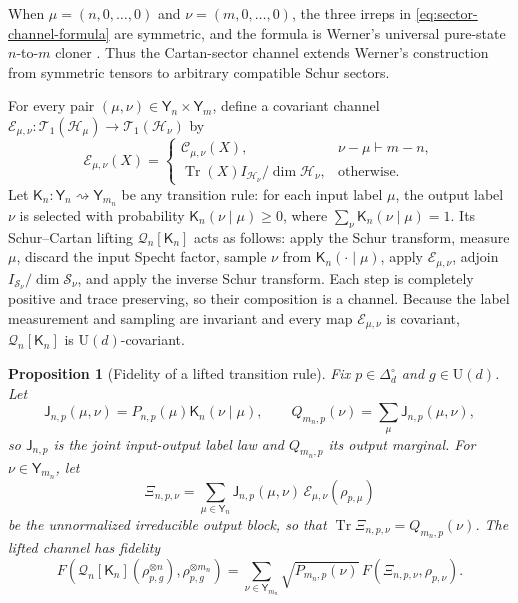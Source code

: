 \documentclass[11pt]{article}
\newtheorem{proposition}[proposition]{Proposition}
\theoremstyle{remark}
\theoremstyle{plain}
\newcommand{\cC}{\mathcal C}
\newcommand{\cE}{\mathcal E}
\newcommand{\cH}{\mathcal H}
\newcommand{\cS}{\mathcal S}
\newcommand{\cT}{\mathcal T}
\newcommand{\U}{\mathrm U}
\newcommand{\Tr}{\operatorname{Tr}}
\newcommand{\ot}{\otimes}
\begin{document}
When \(\mu=(n,0,\ldots,0)\) and \(\nu=(m,0,\ldots,0)\), the three
irreps in \eqref{eq:sector-channel-formula} are symmetric,
and the formula is Werner's universal pure-state \(n\)-to-\(m\) cloner
\cite{Werner1998}.  Thus the Cartan-sector channel extends Werner's
construction from symmetric tensors to arbitrary compatible Schur sectors.

For every pair \((\mu,\nu)\in\mathsf Y_n\times\mathsf Y_m\), define a
covariant channel \(\cE_{\mu,\nu}:\cT_1(\cH_\mu)\to\cT_1(\cH_\nu)\) by
\begin{equation}\label{eq:sector-channel-extension}
  \cE_{\mu,\nu}(X)=
  \begin{cases}
    \cC_{\mu,\nu}(X),&\nu-\mu\vdash m-n,\\[1mm]
    \Tr(X)I_{\cH_\nu}/\dim\cH_\nu,&\text{otherwise}.
  \end{cases}
\end{equation}
Let \(\mathsf K_n:\mathsf Y_n\rightsquigarrow\mathsf Y_{m_n}\) be any transition
rule: for each input label \(\mu\), the output label \(\nu\) is selected
with probability \(\mathsf K_n(\nu\mid\mu)\ge0\), where
\(\sum_\nu \mathsf K_n(\nu\mid\mu)=1\).  Its Schur--Cartan
lifting \(\mathcal Q_n[\mathsf K_n]\) acts as follows: apply the Schur transform, measure
\(\mu\), discard the input Specht factor, sample \(\nu\) from
\(\mathsf K_n(\cdot\mid\mu)\), apply \(\cE_{\mu,\nu}\), adjoin
\(I_{\cS_\nu}/\dim\cS_\nu\), and apply the inverse Schur transform.  Each
step is completely positive and trace preserving, so their composition is a
channel.  Because the label measurement and sampling are invariant and every
map \(\cE_{\mu,\nu}\) is covariant, \(\mathcal Q_n[\mathsf K_n]\) is
\(\U(d)\)-covariant.

\begin{proposition}[Fidelity of a lifted transition rule]
\label{prop:lifted-kernel-bound}
Fix \(p\in\Delta_d^\circ\) and \(g\in\U(d)\).  Let
\begin{equation}\label{eq:lifted-label-laws}
  \mathsf J_{n,p}(\mu,\nu)=P_{n,p}(\mu)\mathsf K_n(\nu\mid\mu),
  \qquad
  Q_{m_n,p}(\nu)=\sum_\mu\mathsf J_{n,p}(\mu,\nu),
\end{equation}
so \(\mathsf J_{n,p}\) is the joint input-output label law and \(Q_{m_n,p}\)
its output marginal.  For \(\nu\in\mathsf Y_{m_n}\), let
\begin{equation}\label{eq:lifted-output-block}
  \Xi_{n,p,\nu}
  =\sum_{\mu\in\mathsf Y_n}\mathsf J_{n,p}(\mu,\nu)\,\cE_{\mu,\nu}(\rho_{p,\mu})
\end{equation}
be the unnormalized irreducible output block, so that
\(\Tr\Xi_{n,p,\nu}=Q_{m_n,p}(\nu)\).
The lifted channel has fidelity
\begin{equation}\label{eq:lifted-exact-block-fidelity}
  F\!\left(
    \mathcal Q_n[\mathsf K_n](\rho_{p,g}^{\ot n}),
    \rho_{p,g}^{\ot m_n}
  \right)
  =\sum_{\nu\in\mathsf Y_{m_n}}
   \sqrt{P_{m_n,p}(\nu)}\,F(\Xi_{n,p,\nu},\rho_{p,\nu}).
\end{equation}
\end{proposition}
\end{document}
